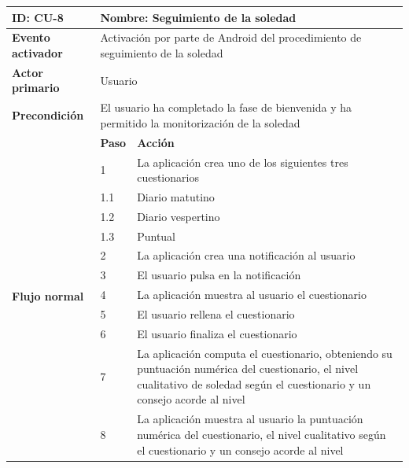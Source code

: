             \begin{table}[h]
                \centering
                \begin{tabularx}{\textwidth}{|l|l|X|}
                    \hline
                    \textbf{ID:} CU-8 & \multicolumn{2}{|X|}{\textbf{Nombre}: Seguimiento de la soledad} \\
                    \hline
                    \textbf{Evento activador} & \multicolumn{2}{|X|}{Activación por parte de Android del procedimiento de seguimiento de la soledad} \\
                    \hline
                    \textbf{Actor primario} & \multicolumn{2}{|X|}{Usuario} \\
                    \hline
                    \textbf{Precondición} & \multicolumn{2}{|X|}{El usuario ha completado la fase de bienvenida y ha permitido la monitorización de la soledad} \\
                    \hline
                    \multirow{13}{*}{\textbf{Flujo normal}} & \textbf{Paso} & \textbf{Acción} \\
                    \cline{2-3} & 1 & La aplicación crea uno de los siguientes tres cuestionarios \\
                    \cline{2-3} & 1.1 & Diario matutino \\
                    \cline{2-3} & 1.2 & Diario vespertino \\
                    \cline{2-3} & 1.3 & Puntual \\
                    \cline{2-3} & 2 & La aplicación crea una notificación al usuario \\
                    \cline{2-3} & 3 & El usuario pulsa en la notificación \\
                    \cline{2-3} & 4 & La aplicación muestra al usuario el cuestionario \\
                    \cline{2-3} & 5 & El usuario rellena el cuestionario \\
                    \cline{2-3} & 6 & El usuario finaliza el cuestionario \\
                    \cline{2-3} & 7 & La aplicación computa el cuestionario, obteniendo su puntuación numérica del cuestionario, el nivel cualitativo de soledad según el cuestionario y un consejo acorde al nivel \\
                    \cline{2-3} & 8 & La aplicación muestra al usuario la puntuación numérica del cuestionario, el nivel cualitativo según el cuestionario y un consejo acorde al nivel \\

\end{tabularx}
\end{table}

